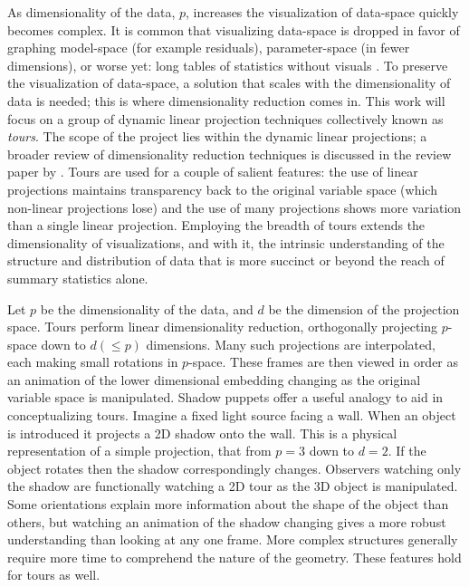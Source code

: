 \documentclass{monashthesis}
\begin{document}
As dimensionality of the data, \(p\), increases the visualization of
data-space quickly becomes complex. It is common that visualizing
data-space is dropped in favor of graphing model-space (for example
residuals), parameter-space (in fewer dimensions), or worse yet: long
tables of statistics without visuals
\autocite{wickham_visualizing_2015}. To preserve the visualization of
data-space, a solution that scales with the dimensionality of data is
needed; this is where dimensionality reduction comes in. This work will
focus on a group of dynamic linear projection techniques collectively
known as \emph{tours}. The scope of the project lies within the dynamic
linear projections; a broader review of dimensionality reduction
techniques is discussed in the review paper by
\textcite{grinstein_high-dimensional_2002}. Tours are used for a couple
of salient features: the use of linear projections maintains
transparency back to the original variable space (which non-linear
projections lose) and the use of many projections shows more variation
than a single linear projection. Employing the breadth of tours extends
the dimensionality of visualizations, and with it, the intrinsic
understanding of the structure and distribution of data that is more
succinct or beyond the reach of summary statistics alone.

Let \(p\) be the dimensionality of the data, and \(d\) be the dimension
of the projection space. Tours perform linear dimensionality reduction,
orthogonally projecting \(p\)-space down to \(d(\leq p)\) dimensions.
Many such projections are interpolated, each making small rotations in
\(p\)-space. These frames are then viewed in order as an animation of
the lower dimensional embedding changing as the original variable space
is manipulated. Shadow puppets offer a useful analogy to aid in
conceptualizing tours. Imagine a fixed light source facing a wall. When
an object is introduced it projects a 2D shadow onto the wall. This is a
physical representation of a simple projection, that from \(p=3\) down
to \(d=2\). If the object rotates then the shadow correspondingly
changes. Observers watching only the shadow are functionally watching a
2D tour as the 3D object is manipulated. Some orientations explain more
information about the shape of the object than others, but watching an
animation of the shadow changing gives a more robust understanding than
looking at any one frame. More complex structures generally require more
time to comprehend the nature of the geometry. These features hold for
tours as well.
\end{document}
